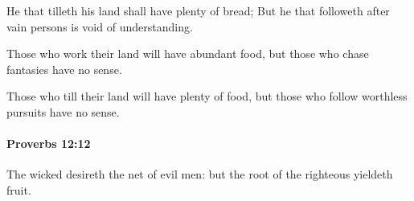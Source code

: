 			\begin{versebox}
					\item[BHS] 
					\item[ASV] He that tilleth his land shall have plenty of bread; But he that followeth after vain persons is void of understanding.
					\item[NIV] Those who work their land will have abundant food, but those who chase fantasies have no sense.
					\item[NRSV] Those who till their land will have plenty of food, but those who follow worthless pursuits have no sense.
			\end{versebox}

		\paragraph{Proverbs 12:12} %
			\label{PROVERBS-12-12}

			The wicked desireth the net of evil men: but the root of the righteous yieldeth fruit.

